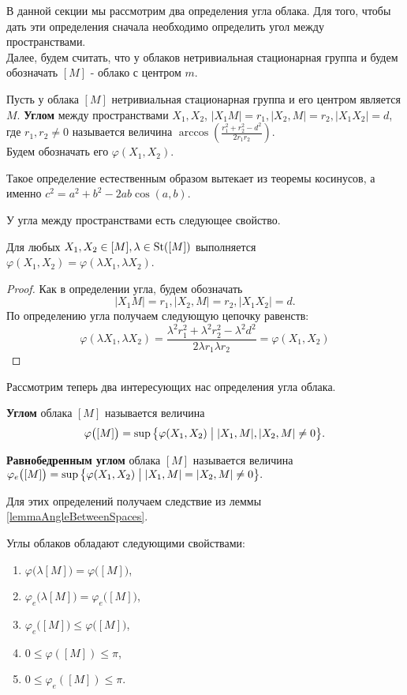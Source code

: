 В данной секции мы рассмотрим два определения угла облака. Для того,
чтобы дать эти определения сначала необходимо определить угол между
пространствами.
\\
Далее, будем считать, что у облаков нетривиальная стационарная группа
и будем обозначать $ [M] $ - облако с центром $ m $.
\begin{defin}
  Пусть у облака $ [M] $ нетривиальная стационарная группа и его
  центром является $ M $. \textbf{Углом} между пространствами $ X_1,
  X_2 $, $ |X_1 M| = r_1, | X_2, M | =r_2, |X_1 X_2| = d$, где $ r_1,
  r_2 \neq 0 $ называется величина $ \arccos \left(\frac{r_1^2 +
  r_{2}^2 - d^2}{2r_1r_2} \right)$.\\ Будем обозначать его $
  \varphi(X_1, X_2) $.
\end{defin}
\begin{remark}
  Такое определение естественным образом вытекает из теоремы
  косинусов, а именно $ c^{2} = a^2 + b^2 - 2ab\cos (a,b) $.
\end{remark}
У угла между пространствами есть следующее свойство.
\begin{lemma}
  \label{lemmaAngleBetweenSpaces}
  Для любых \( X_1, X_2 \in [M], \lambda \in \operatorname{St}([M]) \) выполняется
  \( \varphi (X_1, X_2) = \varphi (\lambda X_1, \lambda X_2) \).
\end{lemma}
\begin{proof}
  Как в определении угла, будем обозначать \[ |X_1 M| = r_1, | X_2, M
  | =r_2, |X_1 X_2| = d.\]
  По определению угла получаем следующую цепочку равенств:
  \[ \varphi (\lambda X_1, \lambda X_2) = \frac{\lambda ^{2} r_1^2 +
    \lambda ^2 r_2^2 - \lambda^2 d^2}{2 \lambda  r_1 \lambda r_2} =
  \varphi (X_1, X_2)\]
\end{proof}
Рассмотрим теперь два интересующих нас определения угла облака.
\begin{defin}
  \textbf{Углом} облака $ [M] $ называется величина
  \[
    \varphi \big([M]\big)= \sup \big\{\varphi (X_1, X_2) \bigm| | X_1,M
    |, |X_2,M| \neq 0\big\}.
  \]
\end{defin}
\begin{defin}
  \textbf{Равнобедренным углом} облака $ [M] $ называется величина
  \(
    \varphi_e \big([M]\big) = \sup \big\{\varphi (X_1, X_2) \bigm|
    |X_1,M | = |X_2,M| \neq 0\big\}.
  \)
\end{defin}
Для этих определений получаем следствие из леммы \ref{lemmaAngleBetweenSpaces}.
\begin{lemma}
  Углы облаков обладают следующими свойствами:
  \begin{enumerate}
    \item \(\varphi \big(\lambda [M]\big) = \varphi \big([M]\big)\),
    \item \(\varphi_e \big(\lambda [M]\big) = \varphi_e \big([M]\big)\),
    \item \( \varphi_e \big([M]\big) \le \varphi \big([M]\big) \),
    \item \(0 \le \varphi ([M]) \le \pi\),
    \item \(0 \le \varphi_e ([M]) \le \pi\).
  \end{enumerate}
\end{lemma}

